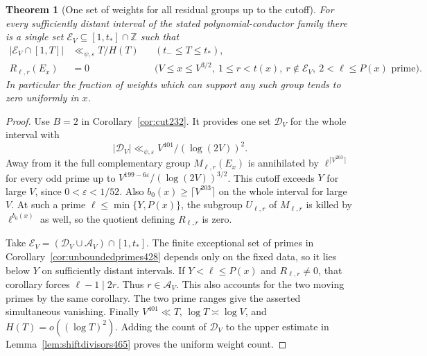 \documentclass[a4paper,11pt]{article}
\newtheorem{theorem}[proposition]{Theorem}
\theoremstyle{definition}
\theoremstyle{remark}
\newcommand{\ZZ}{\mathbb Z}\newcommand{\ord}{\operatorname{ord}}
\numberwithin{equation}{section}
\begin{document}
\begin{theorem}[One set of weights for all residual groups up to the cutoff]\leavevmode
\label{thm:simultaneousweights465}
For every sufficiently distant interval of the stated
polynomial-conductor family there is a single set
\(\mathcal E_V\subseteq[1,t_*]\cap\ZZ\) such that
\[
 \begin{aligned}
  |\mathcal E_V\cap[1,T]|&\ll_{\psi,\varepsilon}T/H(T)
                        &&(t_-\le T\le t_*),\\
  R_{\ell,r}(E_x)&=0
                        &&\bigl(V\le x\le V^{3/2},\
             1\le r<t(x),\ r\notin\mathcal E_V,\
             2<\ell\le P(x)\text{ prime}\bigr).
 \end{aligned}
\]
In particular the fraction of weights which can support any such
group tends to zero uniformly in \(x\).
\end{theorem}
\begin{proof}
Use \(B=2\) in Corollary~\ref{cor:cut232}. It provides one set
\(\mathcal D_V\) for the whole interval with
\[
  |\mathcal D_V|\ll_{\psi,\varepsilon}
               V^{401}/(\log(2V))^2.
\]
Away from it the full complementary group \(M_{\ell,r}(E_x)\)
is annihilated by \(\ell^{\lceil V^{203}\rceil}\) for every odd
prime up to \(V^{199-6\varepsilon}/(\log(2V))^{3/2}\).
This cutoff exceeds \(Y\) for large \(V\), since
\(0<\varepsilon<1/52\). Also \(b_0(x)\ge\lceil V^{203}\rceil\)
on the whole interval for large \(V\). At such a prime
\(\ell\le\min\{Y,P(x)\}\), the subgroup \(U_{\ell,r}\) of
\(M_{\ell,r}\) is killed by \(\ell^{b_0(x)}\) as well, so the
quotient defining \(R_{\ell,r}\) is zero.

Take \(\mathcal E_V=(\mathcal D_V\cup\mathcal A_V)\cap[1,t_*]\).
The finite exceptional set of primes in
Corollary~\ref{cor:unboundedprimes428} depends only on the fixed
data, so it lies below \(Y\) on sufficiently distant intervals.
If \(Y<\ell\le P(x)\) and \(R_{\ell,r}\ne0\), that corollary
forces \(\ell-1\mid2r\). Thus \(r\in\mathcal A_V\). This also
accounts for the two moving primes by the same corollary. The two
prime ranges give the asserted simultaneous vanishing. Finally
\(V^{401}\ll T\), \(\log T\asymp\log V\), and
\(H(T)=o((\log T)^2)\). Adding the count of \(\mathcal D_V\)
to the upper estimate in Lemma~\ref{lem:shiftdivisors465} proves
the uniform weight count.
\end{proof}
\end{document}
